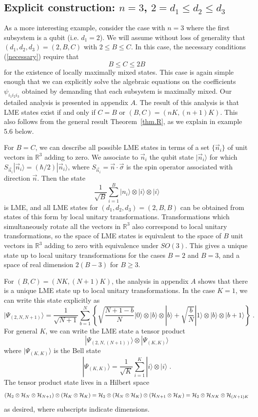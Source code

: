 \documentclass[12pt]{article}
\theoremstyle{definition}
\newcommand{\be}{\begin{equation}}
\newcommand{\ee}{\end{equation}}
\begin{document}
\subsection{Explicit construction: $n=3$, $2 = d_1 \le d_2 \le d_3$}\label{sec:Explicit23}

As a more interesting example, consider the case with $n=3$ where the
first subsystem is a qubit (i.e. $d_1 = 2$). We will assume without
loss of generality that $(d_1, d_2, d_3) = (2,B,C)$ with $2 \le B \le
C$. In this case, the necessary conditions (\ref{necessary}) require
that \be B \le C \le 2 B \ee for the existence of locally maximally
mixed states. This case is again simple enough that we can explicitly
solve the algebraic equations on the coefficients $\psi_{i_1 i_2 i_3}$
obtained by demanding that each subsystem is maximally mixed. Our
detailed analysis is presented in appendix $A$. The result of this
analysis is that LME states exist if and only if $C=B$ or $(B,C) =
(nK,(n+1)K)$. This also follows from the general result Theorem~\ref{thm.R}, as we explain in example 5.6 below.


For $B=C$, we can describe all possible LME states in terms of a set
$\{\vec{n}_i \}$ of unit vectors in $\mathbb{R}^3$ adding to zero. We
associate to $\vec{n}_i$ the qubit state $|\vec{n}_i \rangle$ for
which $S_{\vec{n}_i} |\vec{n}_i \rangle = (\hbar/2)|\vec{n}_i \rangle$, where $S_{\vec{n}_i} = \vec{n} \cdot \vec{\sigma}$ is the spin operator associated with direction $\vec{n}$. Then the state
\be \frac{1}{\sqrt{B}} \sum_{i=1}^B
|n_{i} \rangle  \otimes |i \rangle  \otimes |i \rangle \ee
is LME, and
all LME states for $(d_1,d_2,d_3) = (2,B,B)$ can be obtained from
states of this form by local unitary transformations. Transformations
which simultaneously rotate all the vectors in $\mathbb{R}^3$ also
correspond to local unitary transformations, so the space of LME
states is equivalent to the space of $B$ unit vectors in
$\mathbb{R}^3$ adding to zero with equivalence under $SO(3)$. This
gives a unique state up to local unitary transformations for the cases
$B=2$ and $B=3$, and a space of real dimension $2(B-3)$ for $B \ge 3$.

For $(B,C)=(NK,(N+1)K)$, the analysis in appendix $A$ shows that there is a unique LME state up to local unitary transformations. In the case $K=1$, we can write this state explicitly as
\be
|\Psi_{(2,N,N+1)} \rangle = \frac{1}{\sqrt{N+1}} \sum_{b=1}^N \left\{ \sqrt{\frac{N + 1 - b}{N}} |0 \rangle  \otimes  |b  \rangle  \otimes |b \rangle + \sqrt{\frac{b}{N}}  |1 \rangle  \otimes|b \rangle  \otimes |b+1 \rangle \right\} \; .
\ee
For general $K$, we can write the LME state a tensor product
\be
|\Psi_{(2,N,(N+1))} \rangle  \otimes |\Psi_{(K,K)} \rangle
\ee
where $|\Psi_{(K,K)} \rangle$ is the Bell state
\be
|\Psi_{(K,K)} \rangle = \frac{1}{\sqrt{K}}  \sum_{i=1}^K  |i \rangle  \otimes  |i \rangle \; .
\ee
The tensor product state lives in a Hilbert space
\be
({\cal H}_2  \otimes {\cal H}_N  \otimes {\cal H}_{N+1})  \otimes ({\cal H}_K  \otimes {\cal H}_K) = {\cal H}_2  \otimes ({\cal H}_N  \otimes {\cal H}_K)  \otimes ({\cal H}_{N+1}  \otimes {\cal H}_K) = {\cal H}_2  \otimes {\cal H}_{NK}  \otimes {\cal H}_{(N+1)K}
\ee
as desired, where subscripts indicate dimensions.
\end{document}
